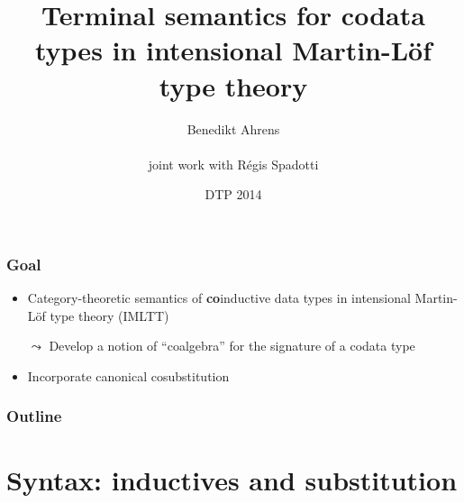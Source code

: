 \documentclass[
]
{beamer}
\title[Terminal semantics for codata types in IMLTT]{Terminal semantics for codata types in intensional Martin-Löf type theory}
\author[B.\ Ahrens and R.\ Spadotti]{Benedikt Ahrens \\~\\ joint work with R\'egis Spadotti}
\date[2014-07-13]{DTP 2014}
\institute[IRIT] %
{%
  Institut de Recherche en Informatique de Toulouse\\
   Universit\'e Paul Sabatier\\ ~ \\
}
\newcommand{\fat}[1]{\textbf{#1}}
\begin{document}
\begin{frame}
 \titlepage
\end{frame}


\begin{frame}
 \frametitle{Goal}
 
   \begin{itemize}\setlength{\itemsep}{1em}
    \item Category-theoretic semantics of \fat{co}inductive data types
          in intensional Martin-L\"of type theory (IMLTT)
    \item [$\leadsto$] Develop a notion of \enquote{coalgebra} for the signature of a codata type
    \item Incorporate canonical cosubstitution
   \end{itemize}


 
\end{frame}


\begin{frame}
 \frametitle{Outline}
 \tableofcontents
\end{frame}


\section{Syntax: inductives and substitution}

\begin{comment}
\begin{frame}
 \frametitle{Starting point: W-types in Martin-L\"of TT}
 
  
 \begin{block}{Well-founded trees as \fat{initial algebra} of polynomial functor}
 
  \begin{itemize}
   \item Trees specified by $A$ and $x:A\vdash B(x)$
   
   \item Type of natural numbers $\mathbb{N} := W~A~B$ with: \[A = \{O,S\}, \quad B(O) = \{\}, \quad B(S)=\{*\}\]
 
   \item The type $W~A~B$ is the (carrier of) the initial algebra of
    \[X \mapsto \sum_{a:A}X^{B(a)} \]
 
 
   
   \item Dybjer '97, Moerdijk and Palmgren '00
  \end{itemize}
 \end{block}
\end{frame}
\end{comment}
\end{document}
